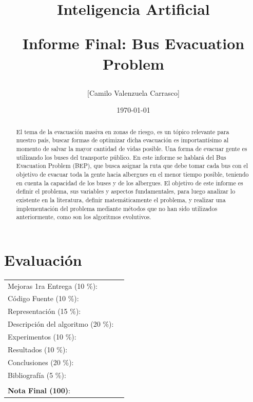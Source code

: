 \documentclass[letter, 10pt]{article}
\begin{document}
\title{Inteligencia Artificial \\ \begin{Large}Informe Final: Bus Evacuation Problem\end{Large}}
\author{[Camilo Valenzuela Carrasco]}
\date{\today}
\maketitle


\section*{Evaluaci\'on}

\begin{tabular}{ll}
Mejoras 1ra Entrega (10 \%): &  \underline{\hspace{2cm}}\\
C\'odigo Fuente (10 \%): &  \underline{\hspace{2cm}}\\
Representaci\'on (15 \%):  & \underline{\hspace{2cm}} \\
Descripci\'on del algoritmo (20 \%):  & \underline{\hspace{2cm}} \\
Experimentos (10 \%):  & \underline{\hspace{2cm}} \\
Resultados (10 \%):  & \underline{\hspace{2cm}} \\
Conclusiones (20 \%): &  \underline{\hspace{2cm}}\\
Bibliograf\'ia (5 \%): & \underline{\hspace{2cm}}\\
 &  \\
\textbf{Nota Final (100)}:   & \underline{\hspace{2cm}}
\end{tabular}

\begin{abstract}
El tema de la evacuación masiva en zonas de riesgo, es un tópico relevante para nuestro país, buscar formas de optimizar dicha evacuación es importantísimo al momento de salvar la mayor cantidad de vidas posible. Una forma de evacuar gente es utilizando los buses del transporte público. En este informe se hablará del Bus Evacuation Problem (BEP), que busca asignar la ruta que debe tomar cada bus con el objetivo de evacuar toda la gente hacia albergues en el menor tiempo posible, teniendo en cuenta la capacidad de los buses y de los albergues. El objetivo de este informe es definir el problema, sus variables y aspectos fundamentales, para luego analizar lo existente en la literatura, definir matemáticamente el problema, y realizar una implementación del problema mediante métodos que no han sido utilizados anteriormente, como son los algoritmos evolutivos.
\end{abstract}
\end{document}
